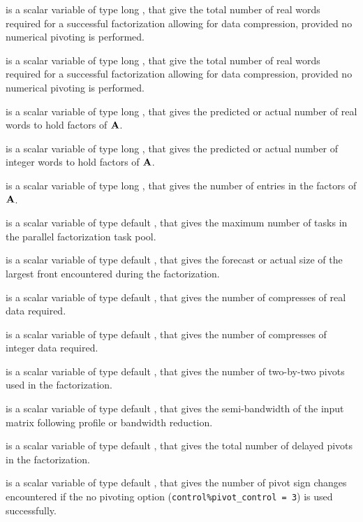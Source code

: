 \documentclass{galahad}
\begin{document}
\begin{description}
 is a scalar variable of type long \integer,
that give the total number of real words required for a
successful factorization allowing for data compression,
provided no numerical pivoting is performed.

 is a scalar variable of type long \integer,
that give the total number of real words required for a
successful factorization allowing for data compression,
provided no numerical pivoting is performed.

 is a scalar variable of type long \integer,
that gives the predicted or actual number of real words to hold factors
of ${\mathbf{A}}$.

 is a scalar variable of type long \integer,
that gives the predicted or actual number of integer words to hold factors
of ${\mathbf{A}}$.

 is a scalar variable of type long \integer,
that gives the number of entries in the factors of ${\mathbf{A}}$.

 is a scalar variable of type default \integer,
that gives the maximum number of tasks in the parallel factorization task pool.

 is a scalar variable of type default \integer,
that gives the forecast or actual size of the largest front encountered
during the factorization.

 is a scalar variable of type default \integer,
that gives the number of compresses of real data required.

 is a scalar variable of type default \integer,
that gives the number of compresses of integer data required.

 is a scalar variable of type default \integer,
that gives the number of two-by-two pivots used in the factorization.

 is a scalar variable of type default \integer,
that gives the semi-bandwidth of the input matrix following
profile or bandwidth reduction.

 is a scalar variable of type default \integer,
that gives the total number of delayed pivots in the factorization.

 is a scalar variable of type default \integer,
that gives the number of pivot sign changes encountered if the no pivoting
option ({\tt control\%pivot\_control = 3}) is used successfully.


\end{description}
\end{document}

